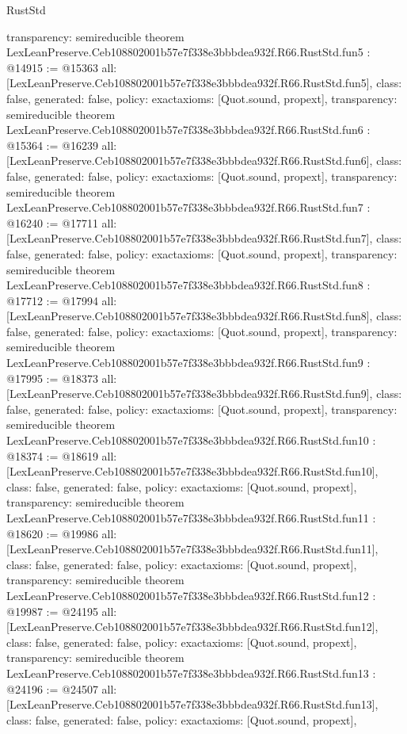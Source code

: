 \begin{lexlean}{RustStd}
\begin{coremodule}
{  transparency: semireducible
}
theorem LexLeanPreserve.Ceb108802001b57e7f338e3bbbdea932f.R66.RustStd.fun5 : @14915 := @15363 {
  all: [LexLeanPreserve.Ceb108802001b57e7f338e3bbbdea932f.R66.RustStd.fun5],
  class: false,
  generated: false,
  policy: exact{axioms: [Quot.sound, propext]},
  transparency: semireducible
}
theorem LexLeanPreserve.Ceb108802001b57e7f338e3bbbdea932f.R66.RustStd.fun6 : @15364 := @16239 {
  all: [LexLeanPreserve.Ceb108802001b57e7f338e3bbbdea932f.R66.RustStd.fun6],
  class: false,
  generated: false,
  policy: exact{axioms: [Quot.sound, propext]},
  transparency: semireducible
}
theorem LexLeanPreserve.Ceb108802001b57e7f338e3bbbdea932f.R66.RustStd.fun7 : @16240 := @17711 {
  all: [LexLeanPreserve.Ceb108802001b57e7f338e3bbbdea932f.R66.RustStd.fun7],
  class: false,
  generated: false,
  policy: exact{axioms: [Quot.sound, propext]},
  transparency: semireducible
}
theorem LexLeanPreserve.Ceb108802001b57e7f338e3bbbdea932f.R66.RustStd.fun8 : @17712 := @17994 {
  all: [LexLeanPreserve.Ceb108802001b57e7f338e3bbbdea932f.R66.RustStd.fun8],
  class: false,
  generated: false,
  policy: exact{axioms: [Quot.sound, propext]},
  transparency: semireducible
}
theorem LexLeanPreserve.Ceb108802001b57e7f338e3bbbdea932f.R66.RustStd.fun9 : @17995 := @18373 {
  all: [LexLeanPreserve.Ceb108802001b57e7f338e3bbbdea932f.R66.RustStd.fun9],
  class: false,
  generated: false,
  policy: exact{axioms: [Quot.sound, propext]},
  transparency: semireducible
}
theorem LexLeanPreserve.Ceb108802001b57e7f338e3bbbdea932f.R66.RustStd.fun10 : @18374 := @18619 {
  all: [LexLeanPreserve.Ceb108802001b57e7f338e3bbbdea932f.R66.RustStd.fun10],
  class: false,
  generated: false,
  policy: exact{axioms: [Quot.sound, propext]},
  transparency: semireducible
}
theorem LexLeanPreserve.Ceb108802001b57e7f338e3bbbdea932f.R66.RustStd.fun11 : @18620 := @19986 {
  all: [LexLeanPreserve.Ceb108802001b57e7f338e3bbbdea932f.R66.RustStd.fun11],
  class: false,
  generated: false,
  policy: exact{axioms: [Quot.sound, propext]},
  transparency: semireducible
}
theorem LexLeanPreserve.Ceb108802001b57e7f338e3bbbdea932f.R66.RustStd.fun12 : @19987 := @24195 {
  all: [LexLeanPreserve.Ceb108802001b57e7f338e3bbbdea932f.R66.RustStd.fun12],
  class: false,
  generated: false,
  policy: exact{axioms: [Quot.sound, propext]},
  transparency: semireducible
}
theorem LexLeanPreserve.Ceb108802001b57e7f338e3bbbdea932f.R66.RustStd.fun13 : @24196 := @24507 {
  all: [LexLeanPreserve.Ceb108802001b57e7f338e3bbbdea932f.R66.RustStd.fun13],
  class: false,
  generated: false,
  policy: exact{axioms: [Quot.sound, propext]},
}
\end{coremodule}
\end{lexlean}
